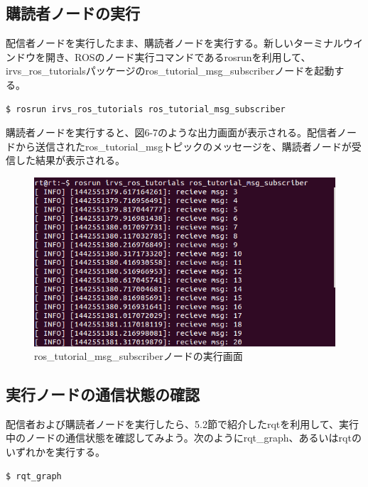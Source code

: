 \subsection{購読者ノードの実行}

配信者ノードを実行したまま、購読者ノードを実行する。新しいターミナルウインドウを開き、ROSのノード実行コマンドであるrosrunを利用して、irvs\_ros\_tutorialsパッケージのros\_tutorial\_msg\_subscriberノードを起動する。

\begin{lstlisting}[language=ROS]
$ rosrun irvs_ros_tutorials ros_tutorial_msg_subscriber
\end{lstlisting}

購読者ノードを実行すると、図6-7のような出力画面が表示される。配信者ノードから送信されたros\_tutorial\_msgトピックのメッセージを、購読者ノードが受信した結果が表示される。

\begin{figure}[htp]
  \centering
  \includegraphics[width=\columnwidth]{pictures/chapter6/pic_06_07.png}
  \caption{ros\_tutorial\_msg\_subscriberノードの実行画面}
\end{figure}


\subsection{実行ノードの通信状態の確認}

配信者および購読者ノードを実行したら、5.2節で紹介したrqtを利用して、実行中のノードの通信状態を確認してみよう。次のようにrqt\_graph、あるいはrqtのいずれかを実行する。

\begin{lstlisting}[language=ROS]
$ rqt_graph
\end{lstlisting}

